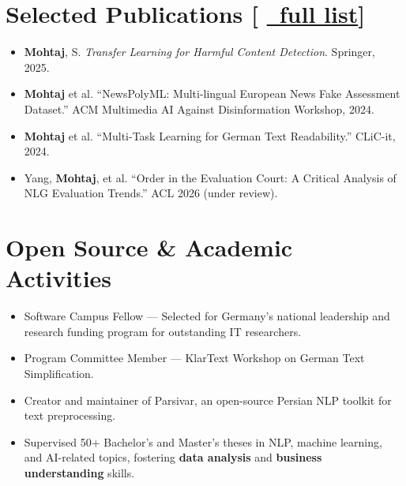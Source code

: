\documentclass[11pt,a4paper]{article}
\newcommand{\cvitem}[1]{
    \item #1
}
\begin{document}
\vspace{0.7em}

\section*{Selected Publications \small [  
    \href{https://scholar.google.com/citations?user=lnrUBN0AAAAJ}{\faGraduationCap \ full list}]}

\begin{itemize}
    \cvitem{\textbf{Mohtaj}, S. \textit{Transfer Learning for Harmful Content Detection}. Springer, 2025.}

    \cvitem{\textbf{Mohtaj} et al. ``NewsPolyML: Multi-lingual European News Fake Assessment Dataset.'' ACM Multimedia AI Against Disinformation Workshop, 2024.}

    \cvitem{\textbf{Mohtaj} et al. ``Multi-Task Learning for German Text Readability.'' CLiC-it, 2024.}

    \cvitem{Yang, \textbf{Mohtaj}, et al. ``Order in the Evaluation Court: A Critical Analysis of NLG Evaluation Trends.'' ACL 2026 (under review).}
\end{itemize}

\vspace{0.7em}

\section*{Open Source \& Academic Activities}

\begin{itemize}
    \cvitem{Software Campus Fellow — Selected for Germany’s national leadership and research funding program for outstanding IT researchers.}

    \cvitem{Program Committee Member — KlarText Workshop on German Text Simplification.}

    \cvitem{Creator and maintainer of Parsivar, an open-source Persian NLP toolkit for text preprocessing.}

    \cvitem{Supervised 50+ Bachelor’s and Master’s theses in NLP, machine learning, and AI-related topics, fostering \textbf{data analysis} and \textbf{business understanding} skills.}

\end{itemize}
\end{document}

